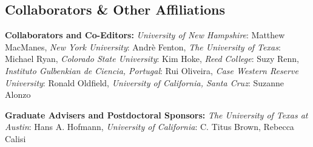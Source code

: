 \documentclass[svgnames,11pt]{article}
\begin{document}
\subsection{Collaborators \& Other Affiliations}

\begin{bibsection}

    \item \textbf{Collaborators and Co-Editors:}
        \emph{University of New Hampshire}:
            Matthew MacManes,
        \emph{New York University}:
            Andr\`e Fenton,
        \emph{The University of Texas}:
            Michael Ryan,
        \emph{Colorado State University}:
            Kim Hoke,
        \emph{Reed College}:
            Suzy Renn,
        \emph{Instituto Gulbenkian de Ciencia, Portugal}:
            Rui Oliveira,
        \emph{Case Western Reserve University}:
            Ronald Oldfield,
        \emph{University of California, Santa Cruz}:
            Suzanne Alonzo

    \item \textbf{Graduate Advisers and Postdoctoral Sponsors:}
        \emph{The University of Texas at Austin}:
            Hans A. Hofmann,
        \emph{University of California}:
            C. Titus Brown, 
            Rebecca Calisi

\end{bibsection}
\end{document}
